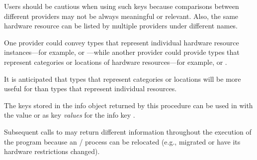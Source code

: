 \begin{users}
  Users should be cautious when using such keys because comparisons between different providers may not be always
  meaningful or relevant. Also, the same hardware resource can be listed by multiple providers under different
  names.
  
\begin{sloppy}  One provider could convey types that represent individual hardware resource instances---for example,  or ---while another provider could provide types that represent categories or locations of hardware resources{\hspace{0pt}}---for example,  or .
\end{sloppy}
  
  It is anticipated that types that represent categories
  or locations will be more useful for 
  than types that represent individual resources.
\end{users}

\begin{users}  
  The keys stored in the info object returned by this procedure can be used in
   with the   value  
  or  as key \emph{values} for the info key .
\end{users}

Subsequent calls to  may return different information throughout the execution
of the program because an \MPI/ process can be relocated (e.g., migrated or have its hardware restrictions changed).

